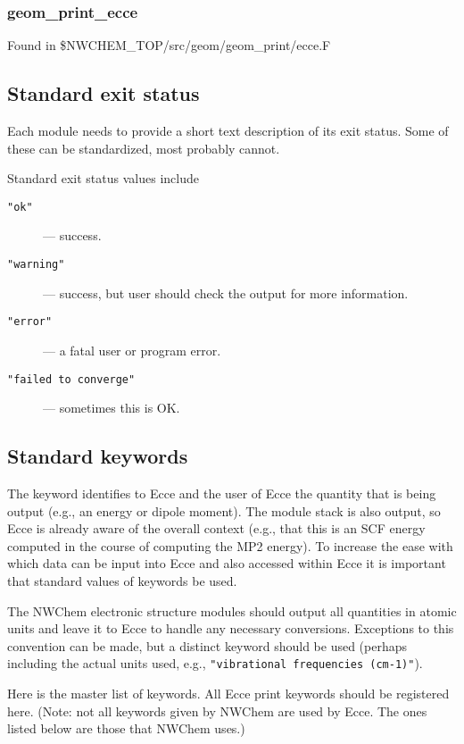 \subsubsection{ geom\_print\_ecce }
Found in \$NWCHEM\_TOP/src/geom/geom\_print/ecce.F

\subsection{Standard exit status}

Each module needs to provide a short text description of its exit
status.  Some of these can be standardized, most probably cannot.

Standard exit status values include

\begin{description}
\item [\verb+"ok"+] --- success.
\item [\verb+"warning"+] --- success, but user should check the output for
  more information.
\item [\verb+"error"+] --- a fatal user or program error.
\item [\verb+"failed to converge"+] --- sometimes this is OK.
\end{description}

\subsection{Standard keywords}

The keyword identifies to Ecce and the user of Ecce the quantity
that is being output (e.g., an energy or dipole moment).  The module
stack is also output, so Ecce is already aware of the overall context
(e.g., that this is an SCF energy computed in the course of computing
the MP2 energy).  To increase the ease with which data can be input
into Ecce and also accessed within Ecce it is important that
standard values of keywords be used.

The NWChem electronic structure modules should output all quantities
in atomic units and leave it to Ecce to handle any necessary
conversions.  Exceptions to this convention can be made, but a
distinct keyword should be used (perhaps including the actual units
used, e.g., \verb+"vibrational frequencies (cm-1)"+).

Here is the master list of keywords.  All Ecce print keywords should
be registered here.  (Note: not all keywords given by NWChem are used
by Ecce.  The ones listed below are those that NWChem uses.)


